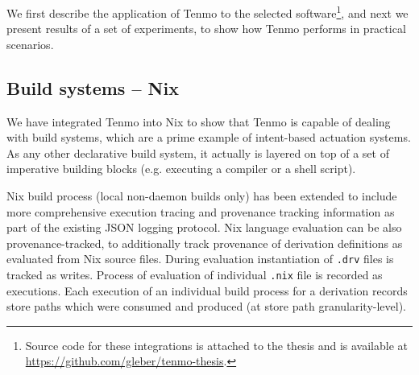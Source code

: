 We first describe the application of Tenmo to the selected software\footnote{Source code for these integrations is attached to the thesis and is available at \url{https://github.com/gleber/tenmo-thesis}.}, and next we present results of a set of experiments, to show how Tenmo performs in practical scenarios.

\subsection{Build systems -- Nix}\label{sec:nix-implementation}

We have integrated Tenmo into Nix to show that Tenmo is capable of dealing with build systems, which are a prime example of intent-based actuation systems. As any other declarative build system, it actually is layered on top of a set of imperative building blocks (e.g. executing a compiler or a shell script).

Nix build process (local non-daemon builds only) has been extended to include more comprehensive execution tracing and provenance tracking information as part of the existing JSON logging protocol. Nix language evaluation can be also provenance-tracked, to additionally track provenance of derivation definitions as evaluated from Nix source files. During evaluation instantiation of \texttt{.drv} files is tracked as writes. Process of evaluation of individual \texttt{.nix} file is recorded as executions. Each execution of an individual build process for a derivation records store paths which were consumed and produced (at store path granularity-level).

